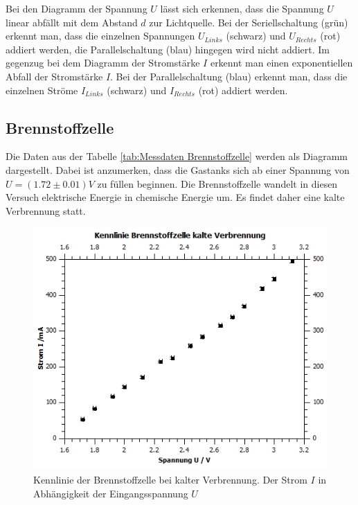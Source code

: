\documentclass[12pt,a4paper,twoside]{article}
\begin{document}
\noindent
Bei den Diagramm der Spannung $U$ lässt sich erkennen, dass die Spannung $U$ linear abfällt mit dem Abstand $d$ zur Lichtquelle. Bei der Seriellschaltung (grün) erkennt man, dass die einzelnen Spannungen $U_{Links}$ (schwarz) und $U_{Rechts}$ (rot) addiert werden, die Parallelschaltung (blau) hingegen wird nicht addiert. 
Im gegenzug bei dem Diagramm der Stromstärke $I$ erkennt man einen exponentiellen Abfall der Stromstärke $I$. Bei der Parallelschaltung (blau) erkennt man, dass die einzelnen Ströme $I_{Links}$ (schwarz) und $I_{Rechts}$ (rot) addiert werden. 

\subsection{Brennstoffzelle}
Die Daten aus der Tabelle \ref{tab:Messdaten Brennstoffzelle} werden als Diagramm dargestellt. Dabei ist anzumerken, dass die Gastanks sich ab einer Spannung von $U = (1.72 \pm 0.01)V$ zu füllen beginnen. 
Die Brennstoffzelle wandelt in diesen Versuch elektrische Energie in chemische Energie um. Es findet daher eine kalte Verbrennung statt. 

\begin{figure}[H]
    \centering
    \includegraphics[width=0.6\linewidth]{nudes/brennstoff diagramm i-u.jpg}
    \caption{Kennlinie der Brennstoffzelle bei kalter Verbrennung. Der Strom $I$ in Abhängigkeit der Eingangsspannung $U$}
    \label{fig:diagramm Brennstoffzelle I-U}
\end{figure}
\end{document}
